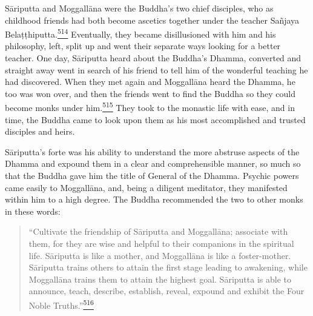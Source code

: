 Sāriputta and Moggallāna were the Buddha's two chief disciples, who as
childhood friends had both become ascetics together under the teacher
Sañjaya
Belaṭṭhiputta.\label{footprints_split_014.html_fnref514}\hyperref[footprints_split_025.htmlux5cux23fn514]{\textsuperscript{514}}
Eventually, they became disillusioned with him and his philosophy, left,
split up and went their separate ways looking for a better teacher. One
day, Sāriputta heard about the Buddha's Dhamma, converted and straight
away went in search of his friend to tell him of the wonderful teaching
he had discovered. When they met again and Moggallāna heard the Dhamma,
he too was won over, and then the friends went to find the Buddha so
they could become monks under
him.\label{footprints_split_014.html_fnref515}\hyperref[footprints_split_025.htmlux5cux23fn515]{\textsuperscript{515}}
They took to the monastic life with ease, and in time, the Buddha came
to look upon them as his most accomplished and trusted disciples and
heirs.

Sāriputta's forte was his ability to understand the more abstruse
aspects of the Dhamma and expound them in a clear and comprehensible
manner, so much so that the Buddha gave him the title of General of the
Dhamma. Psychic powers came easily to Moggallāna, and, being a diligent
meditator, they manifested within him to a high degree. The Buddha
recommended the two to other monks in these words:

\begin{quote}
``Cultivate the friendship of Sāriputta and Moggallāna; associate with
them, for they are wise and helpful to their companions in the spiritual
life. Sāriputta is like a mother, and Moggallāna is like a
foster-mother. Sāriputta trains others to attain the first stage leading
to awakening, while Moggallāna trains them to attain the highest goal.
Sāriputta is able to announce, teach, describe, establish, reveal,
expound and exhibit the Four Noble
Truths.''\label{footprints_split_014.html_fnref516}\hyperref[footprints_split_025.htmlux5cux23fn516]{\textsuperscript{516}}
\end{quote}

